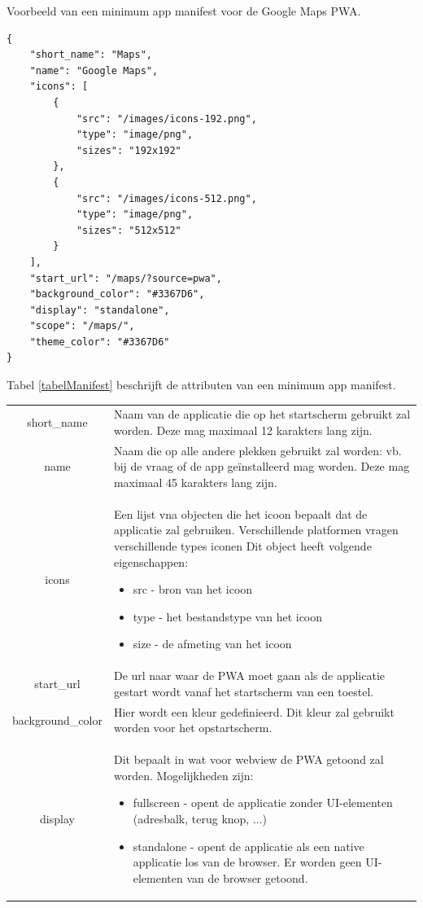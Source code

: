 	Voorbeeld van een minimum app manifest voor de Google Maps PWA.
	
\begin{lstlisting}
{
	"short_name": "Maps",
	"name": "Google Maps",
	"icons": [
		{
			"src": "/images/icons-192.png",
			"type": "image/png",
			"sizes": "192x192"
		},
		{
			"src": "/images/icons-512.png",
			"type": "image/png",
			"sizes": "512x512"
		}
	],
	"start_url": "/maps/?source=pwa",
	"background_color": "#3367D6",
	"display": "standalone",
	"scope": "/maps/",
	"theme_color": "#3367D6"
}
\end{lstlisting}
	
	\newpage
		Tabel \ref{tabelManifest} beschrijft de attributen van een minimum app manifest.
	
		\begin{table}[H]
			\centering
			\begin{tabular}{cp{12cm}}
	     		short\_name & Naam van de applicatie die op het startscherm gebruikt zal worden. Deze mag maximaal 12 karakters lang zijn. \\
	     		name & Naam die op alle andere plekken gebruikt zal worden: vb. bij de vraag of de app geïnstalleerd mag worden. Deze mag maximaal 45 karakters lang zijn. \\
	     		icons & Een lijst vna objecten die het icoon bepaalt dat de applicatie zal gebruiken. Verschillende platformen vragen verschillende types iconen Dit object heeft volgende eigenschappen:
		     		\begin{itemize}
			    		  \item src - bron van het icoon
			    		  \item type - het bestandstype van het icoon
			    		  \item size - de afmeting van het icoon
	     			\end{itemize} \\
	     		start\_url & De url naar waar de PWA moet gaan als de applicatie gestart wordt vanaf het startscherm van een toestel.\\
	     		background\_color & Hier wordt een kleur gedefinieerd. Dit kleur zal gebruikt worden voor het opstartscherm. \\
	     		display & Dit bepaalt in wat voor webview de PWA getoond zal worden. Mogelijkheden zijn:
		     		\begin{itemize}
			     		  \item fullscreen - opent de applicatie zonder UI-elementen (adresbalk, terug knop, ...)
			     		  \item standalone - opent de applicatie als een native applicatie los van de browser. Er worden geen UI-elementen van de browser getoond.

\end{itemize}
\end{tabular}
\end{table}
